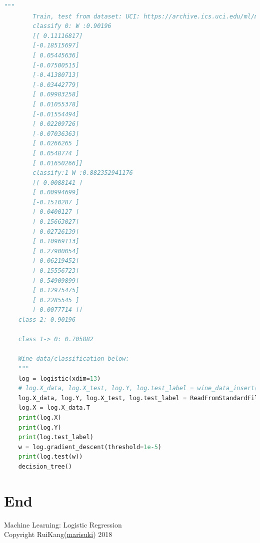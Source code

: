 \documentclass{article}
\begin{document}
\begin{lstlisting}[language={Python},title={hyperparams.py}]
    """
        Train, test from dataset: UCI: https://archive.ics.uci.edu/ml/machine-learning-databases/wine
        classify 0: W :0.90196
        [[ 0.11116817]
        [-0.18515697]
        [ 0.05445636]
        [-0.07500515]
        [-0.41380713]
        [-0.03442779]
        [ 0.09983258]
        [ 0.01055378]
        [-0.01554494]
        [ 0.02209726]
        [-0.07036363]
        [ 0.0266265 ]
        [ 0.0548774 ]
        [ 0.01650266]]
        classify:1 W :0.882352941176
        [[ 0.0088141 ]
        [ 0.00994699]
        [-0.1510287 ]
        [ 0.0400127 ]
        [ 0.15663027]
        [ 0.02726139]
        [ 0.10969113]
        [ 0.27900054]
        [ 0.06219452]
        [ 0.15556723]
        [-0.54909899]
        [ 0.12975475]
        [ 0.2285545 ]
        [-0.0077714 ]]
    class 2: 0.90196
    
    class 1-> 0: 0.705882

    Wine data/classification below:
    """
    log = logistic(xdim=13)
    # log.X_data, log.X_test, log.Y, log.test_label = wine_data_insert()
    log.X_data, log.Y, log.X_test, log.test_label = ReadFromStandardFile(mask=2)  # 1
    log.X = log.X_data.T
    print(log.X)
    print(log.Y)
    print(log.test_label)
    w = log.gradient_descent(threshold=1e-5)
    print(log.test(w))
    decision_tree()

\end{lstlisting}


\section{End}
Machine Learning: Logistic Regression\\

Copyright \textcopyright RuiKang(\href{https://github.com/marisuki}{marisuki}) 2018
\end{document}
